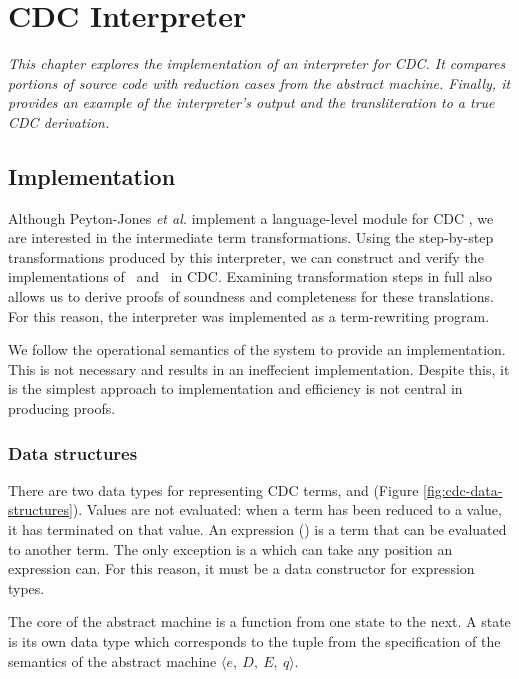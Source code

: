 \chapter{CDC Interpreter}\label{chapter:interpreter}

\textit{
This chapter explores the implementation of an interpreter for CDC.
It compares portions of source code with reduction cases from the abstract machine.
Finally, 
it provides an example of the interpreter's output and the transliteration to a true CDC derivation. 
}

\section{Implementation}

Although Peyton-Jones \emph{et al.} implement a language-level module for CDC \cite{JonesDS07}, 
we are interested in the intermediate term transformations.
Using the step-by-step transformations produced by this interpreter,
we can construct and verify the implementations of \ltry\ and \lmu\ in CDC.
Examining transformation steps in full also allows us to derive proofs of soundness and completeness for these translations. 
For this reason, the interpreter was implemented as a term-rewriting program.

We follow the operational semantics of the system to provide an implementation.
This is not necessary and results in an ineffecient implementation.
Despite this, it is the simplest approach to implementation and efficiency is not central in producing proofs.

\subsection{Data structures}
There are two data types for representing CDC terms,  and 
(Figure \ref{fig:cdc-data-structures}).
Values are not evaluated: when a term has been reduced to a value, 
it has terminated on that value. 
An expression () is a term that can be evaluated to another term. 
The only exception is a  which can take any position an expression can. 
For this reason, it must be a data constructor for expression types.

The core of the abstract machine is a function from one state to the next. 
A state is its own data type which corresponds to the tuple from the specification of the semantics of the abstract machine $\langle e,\ D,\ E,\ q\rangle$.

